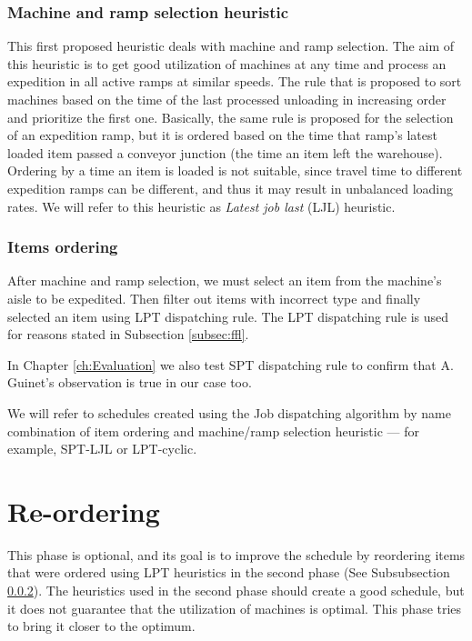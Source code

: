 \documentclass{ctuthesis}
\begin{document}
\subsubsection{Machine and ramp selection heuristic }

This first proposed heuristic deals with machine and ramp selection.
The aim of this heuristic is to get good utilization of machines at any time and process an expedition in all active ramps at similar speeds. The rule that is proposed to sort machines based on the time of the last processed unloading in increasing order and prioritize the first one. 
Basically, the same rule is proposed for the selection of an expedition ramp, but it is ordered based on the time that ramp's latest loaded item passed a conveyor junction (the time an item left the warehouse). Ordering by a time an item is loaded is not suitable, since travel time to different expedition ramps can be different, and thus it may result in unbalanced loading rates. We will refer to this heuristic as \emph{Latest job last} (LJL) heuristic.

\subsubsection{Items ordering}
\label{subsubsec:itemsordering}

After machine and ramp selection, we must select an item from the machine's aisle to be expedited. Then filter out items with incorrect type and finally selected an item using LPT dispatching rule. The LPT dispatching rule is used for reasons stated in Subsection \ref{subsec:ffl}.

In Chapter \ref{ch:Evaluation} we also test SPT dispatching rule to confirm that A. Guinet's observation is true in our case too. 

We will refer to schedules created using the Job dispatching algorithm by name combination of item ordering and machine/ramp selection heuristic — for example, SPT-LJL or LPT-cyclic.

\section{Re-ordering}

This phase is optional, and its goal is to improve the schedule by reordering items that were ordered using LPT heuristics in the second phase (See Subsubsection \ref{subsubsec:itemsordering}). The heuristics used in the second phase should create a good schedule, but it does not guarantee that the utilization of machines is optimal. This phase tries to bring it closer to the optimum.
\end{document}
